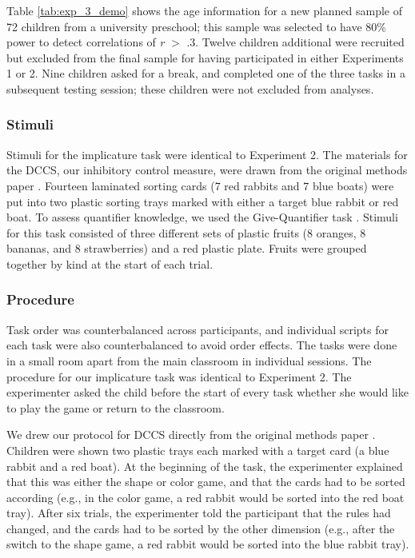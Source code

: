 \documentclass[man]{apa2}
\begin{document}
Table \ref{tab:exp_3_demo} shows the age information for a new planned sample of 72 children from a university preschool; this sample was selected to have 80\% power to detect correlations of \emph{r} $>$ .3. Twelve children additional were recruited but excluded from the final sample for having participated in either Experiments 1 or 2. Nine children asked for a break, and completed one of the three tasks in a subsequent testing session; these children were not excluded from analyses.


\subsubsection{Stimuli} Stimuli for the implicature task were identical to Experiment 2. The materials for the DCCS, our inhibitory control measure, were drawn from the original methods paper \cite{zelazo2006}. Fourteen laminated sorting cards (7 red rabbits and 7 blue boats) were put into two plastic sorting trays marked with either a target blue rabbit or red boat. To assess quantifier knowledge, we used the Give-Quantifier task \cite{barner2009}. Stimuli for this task consisted of three different sets of plastic fruits (8 oranges, 8 bananas, and 8 strawberries) and a red plastic plate. Fruits were grouped together by kind at the start of each trial.

\subsubsection{Procedure}
Task order was counterbalanced across participants, and individual scripts for each task were also counterbalanced to avoid order effects. The tasks were done in a small room apart from the main classroom in individual sessions. The procedure for our implicature task was identical to Experiment 2. The experimenter asked the child before the start of every task whether she would like to play the game or return to the classroom.

We drew our protocol for DCCS directly from the original methods paper \cite{zelazo2006}. Children were shown two plastic trays each marked with a target card (a blue rabbit and a red boat). At the beginning of the task, the experimenter explained that this was either the shape or color game, and that the cards had to be sorted according (e.g., in the color game, a red rabbit would be sorted into the red boat tray). After six trials, the experimenter told the participant that the rules had changed, and the cards had to be sorted by the other dimension (e.g., after the switch to the shape game, a red rabbit would be sorted into the blue rabbit tray).
\end{document}
